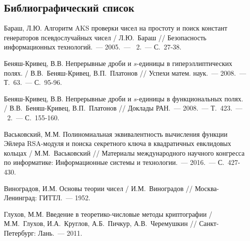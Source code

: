 \documentclass[_00_dissertation.tex]{subfiles}
\begin{document}
\onlyinsubfile{
    \renewcommand{\contentsname}{ОГЛАВЛЕНИЕ}
    \setcounter{tocdepth}{3}
    \tableofcontents
}


\renewcommand{\bibname}{Список использованных источников}

\begin{thebibliography}{99}
\section*{Библиографический список}
\vspace{-12pt}

    Бараш, Л.Ю. Алгоритм AKS проверки чисел на простоту и поиск констант генераторов псевдослучайных чисел / Л.Ю.~Бараш // Безопасность информационных технологий.~--- 2005.~--- \textnumero~2.~--- С.~27-38.

    Беняш-Кривец, В.В. Непрерывные дроби и $s$-единицы в гиперэллиптических полях. / В.В.~Беняш-Кривец, В.П.~Платонов // Успехи матем. наук.~--- 2008.~--- Т.~63.~--- С.~95-96.
    
    Беняш-Кривец, В.В. Непрерывные дроби и $s$-единицы в функциональных полях. / В.В.~Беняш-Кривец, В.П.~Платонов // Доклады РАН.~--- 2008.~--- Т.~423.~--- \textnumero~2.~--- С.~155-160.

    Васьковский, М.М. Полиномиальная эквивалентность вычисления функции Эйлера RSA-модуля и поиска секретного ключа в квадратичных евклидовых кольцах / М.М.~Васьковский // Материалы международного научного конгресса по информатике: Информационные системы и технологии.~--- 2016.~--- С.~427-430.

    Виноградов, И.М. Основы теории чисел / И.М.~Виноградов // Москва-Ленинград: ГИТТЛ.~--- 1952.

    Глухов, М.М. Введение в теоретико-числовые методы криптографии / М.М.~Глухов, И.А.~Круглов, А.Б.~Пичкур, А.В.~Черемушкин // Санкт-Петербург: Лань.~--- 2011.


\end{thebibliography}
\end{document}
